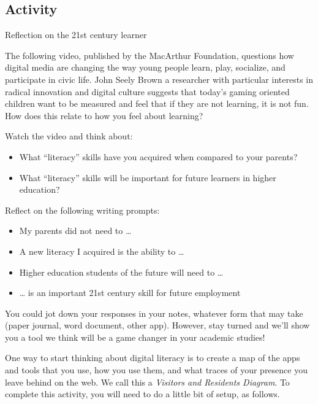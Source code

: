 \documentclass[
]{book}
\providecommand{\tightlist}{%
  \setlength{\itemsep}{0pt}\setlength{\parskip}{0pt}}
\theoremstyle{definition}
\theoremstyle{definition}
\theoremstyle{definition}
\theoremstyle{definition}
\theoremstyle{remark}
\begin{document}
\hypertarget{activity-1}{%
\subsection*{Activity}\label{activity-1}}

\begin{reflect}
{Reflection on the 21st century learner}

The following video, published by the MacArthur Foundation, questions how digital media are changing the way young people learn, play, socialize, and participate in civic life. John Seely Brown a researcher with particular interests in radical innovation and digital culture suggests that today's gaming oriented children want to be measured and feel that if they are not learning, it is not fun. How does this relate to how you feel about learning?

Watch the video and think about:

\begin{itemize}
\tightlist
\item
  What ``literacy'' skills have you acquired when compared to your parents?\\
\item
  What ``literacy'' skills will be important for future learners in higher education?
\end{itemize}

Reflect on the following writing prompts:

\begin{itemize}
\tightlist
\item
  My parents did not need to \ldots{}\\
\item
  A new literacy I acquired is the ability to \ldots{}\\
\item
  Higher education students of the future will need to \ldots{}\\
\item
  \ldots{} is an important 21st century skill for future employment
\end{itemize}

You could jot down your responses in your notes, whatever form that may take (paper journal, word document, other app). However, stay turned and we'll show you a tool we think will be a game changer in your academic studies!
\end{reflect}

One way to start thinking about digital literacy is to create a map of the apps and tools that you use, how you use them, and what traces of your presence you leave behind on the web. We call this a \emph{Visitors and Residents Diagram}. To complete this activity, you will need to do a little bit of setup, as follows.
\end{document}
